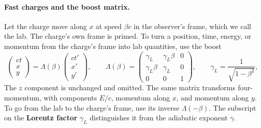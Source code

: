 \paragraph{Fast charges and the boost matrix.} Let the charge move along $x$ at speed $\beta c$ in the observer's frame, which we call the lab. The charge's own frame is primed. To turn a position, time, energy, or momentum from the charge's frame into lab quantities, use the boost
\begin{equation}
	\begin{pmatrix}ct\\x\\y\end{pmatrix}=\Lambda(\beta)\begin{pmatrix}ct'\\x'\\y'\end{pmatrix},\qquad
	\Lambda(\beta)=\begin{pmatrix}\gamma_L&\gamma_L\beta&0\\ \gamma_L\beta&\gamma_L&0\\0&0&1\end{pmatrix},\qquad
	\gamma_L=\frac{1}{\sqrt{1-\beta^2}} ,
	\label{fp:eq:boost}
\end{equation}
The $z$ component is unchanged and omitted. The same matrix transforms four-momentum, with components $E/c$, momentum along $x$, and momentum along $y$. To go from the lab to the charge's frame, use its inverse $\Lambda(-\beta)$. The subscript on the \textbf{Lorentz factor} $\gamma_L$ distinguishes it from the adiabatic exponent $\gamma$.

